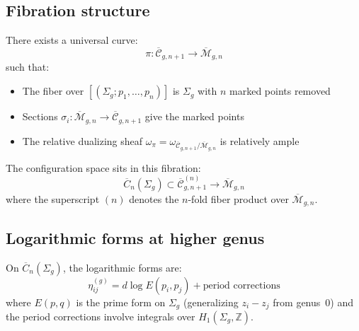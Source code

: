 \subsection{Fibration structure}

\begin{theorem}
\label{thm:universal-curve-fibration}
There exists a universal curve:
\begin{equation}
\pi: \overline{\mathcal{C}}_{g,n+1} \to \overline{\mathcal{M}}_{g,n}
\end{equation}
such that:
\begin{itemize}
\item The fiber over $[(\Sigma_g; p_1, \ldots, p_n)]$ is $\Sigma_g$ with $n$ marked points removed
\item Sections $\sigma_i: \overline{\mathcal{M}}_{g,n} \to \overline{\mathcal{C}}_{g,n+1}$ give the marked points
\item The relative dualizing sheaf $\omega_\pi = \omega_{\overline{\mathcal{C}}_{g,n+1}/\overline{\mathcal{M}}_{g,n}}$ is relatively ample
\end{itemize}

The configuration space sits in this fibration:
\begin{equation}
\overline{C}_n(\Sigma_g) \subset \overline{\mathcal{C}}_{g,n+1}^{(n)} \to \overline{\mathcal{M}}_{g,n}
\end{equation}
where the superscript $(n)$ denotes the $n$-fold fiber product over $\overline{\mathcal{M}}_{g,n}$.
\end{theorem}

\subsection{Logarithmic forms at higher genus}

\begin{definition}
\label{def:higher-genus-log-forms}
On $\overline{C}_n(\Sigma_g)$, the logarithmic forms are:
\begin{equation}
\eta_{ij}^{(g)} = d \log E(p_i, p_j) + \text{period corrections}
\end{equation}
where $E(p, q)$ is the prime form on $\Sigma_g$ (generalizing $z_i - z_j$ from genus~0) and the period corrections involve integrals over $H_1(\Sigma_g, \mathbb{Z})$.
\end{definition}

